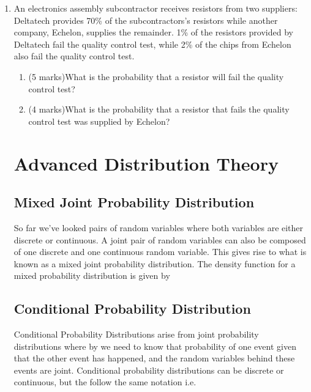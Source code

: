 	\begin{enumerate}
		
		\item An electronics assembly subcontractor receives resistors from two suppliers: Deltatech provides
		70\% of the subcontractors's resistors while another company, Echelon, supplies the remainder.
		1\% of the resistors provided by Deltatech fail the quality control test, while 2\% of the
		chips from Echelon also fail the quality control test.
		
		\begin{enumerate}
			\item (5 marks)What is the probability that a resistor will fail the quality control test?
			
			
			\item (4 marks)What is the probability that a resistor that fails the quality control test was supplied by Echelon?
		\end{enumerate}
		
		
		\vspace{0.25cm}
		
		

\chapter{Advanced Distribution Theory}

\section{Mixed Joint Probability Distribution}
So far we've looked pairs of random variables where both variables are either discrete or continuous. A joint pair of random variables can also be composed of one discrete and one continuous random variable. This gives rise to what is known as a mixed joint probability distribution.
The density function for a mixed probability distribution is given by




\section{Conditional Probability Distribution}

Conditional Probability Distributions arise from joint probability distributions where by we need to know that probability of one event given that the other event has happened, and the random variables behind these events are joint.
Conditional probability distributions can be discrete or continuous, but the follow the same notation i.e.


\end{enumerate}
